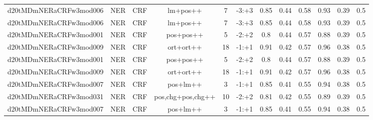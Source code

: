 \documentclass[a4paper]{article}
\begin{document}
\begin{landscape}
\begin{center}
\begin{tabular}{ |c|c|c|c|c|c|c|c|c|c|c|c|}
 	
 		
 		\small{ d20tMDmNERaCRFw3mod006 } & NER & CRF & lm+pos++  &  7 &  -3:+3  &  0.85 & 0.44 & 0.58  &  0.93 & 0.39 & 0.5 \\
 		

 	
 
 	
 		
 		\small{ d20tMDmNERaCRFw3mod006 } & NER & CRF & lm+pos++  &  7 &  -3:+3  &  0.85 & 0.44 & 0.58  &  0.93 & 0.39 & 0.5 \\
 		

 	
 
 	
 		
 		\small{ d20tMDmNERaCRFw3mod001 } & NER & CRF & pos+pos++  &  5 &  -2:+2  &  0.8 & 0.44 & 0.57  &  0.88 & 0.39 & 0.5 \\
 		

 	
 
 	
 		
 		\small{ d20tMDmNERaCRFw3mod009 } & NER & CRF & ort+ort++  &  18 &  -1:+1  &  0.91 & 0.42 & 0.57  &  0.96 & 0.38 & 0.5 \\
 		

 	
 
 	
 		
 		\small{ d20tMDmNERaCRFw3mod001 } & NER & CRF & pos+pos++  &  5 &  -2:+2  &  0.8 & 0.44 & 0.57  &  0.88 & 0.39 & 0.5 \\
 		

 	
 
 	
 		
 		\small{ d20tMDmNERaCRFw3mod009 } & NER & CRF & ort+ort++  &  18 &  -1:+1  &  0.91 & 0.42 & 0.57  &  0.96 & 0.38 & 0.5 \\
 		

 	
 
 	
 		
 		\small{ d20tMDmNERaCRFw3mod007 } & NER & CRF & pos+lm++  &  3 &  -1:+1  &  0.85 & 0.41 & 0.55  &  0.94 & 0.38 & 0.5 \\
 		

 	
 
 	
 		
 		\small{ d20tMDmNERaCRFw3mod031 } & NER & CRF & pos,chg+pos,chg++  &  10 &  -2:+2  &  0.81 & 0.42 & 0.55  &  0.89 & 0.39 & 0.5 \\
 		

 	
 
 	
 		
 		\small{ d20tMDmNERaCRFw3mod007 } & NER & CRF & pos+lm++  &  3 &  -1:+1  &  0.85 & 0.41 & 0.55  &  0.94 & 0.38 & 0.5 \\
 		


\end{tabular}
\end{center}
\end{landscape}
\end{document}
